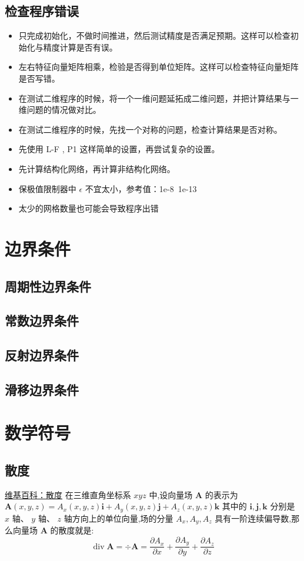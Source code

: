 \documentclass{book}
\begin{document}
\subsection{检查程序错误}
\begin{itemize}
  \item 只完成初始化，不做时间推进，然后测试精度是否满足预期。这样可以检查初始化与精度计算是否有误。
  \item 左右特征向量矩阵相乘，检验是否得到单位矩阵。这样可以检查特征向量矩阵是否写错。
  \item 在测试二维程序的时候，将一个一维问题延拓成二维问题，并把计算结果与一维问题的情况做对比。
  \item 在测试二维程序的时候，先找一个对称的问题，检查计算结果是否对称。
  \item 先使用 L-F , P1 这样简单的设置，再尝试复杂的设置。
  \item 先计算结构化网络，再计算非结构化网络。
  \item 保极值限制器中 $\epsilon$ 不宜太小，参考值：1e-8~1e-13
  \item 太少的网格数量也可能会导致程序出错
\end{itemize}

\section{边界条件}
\subsection{周期性边界条件}
\subsection{常数边界条件}
\subsection{反射边界条件}
\subsection{滑移边界条件}


\section{数学符号}
\subsection{散度}
\href{https://zh.wikipedia.org/zh-hans/%E6%95%A3%E5%BA%A6}{维基百科：散度} 
在三维直角坐标系  $x y z$  中,设向量场  $\boldsymbol{A}$  的表示为
$\boldsymbol{A}(x, y, z)=A_{x}(x, y, z) \boldsymbol{i}+A_{y}(x, y, z) \boldsymbol{j}+A_{z}(x, y, z) \boldsymbol{k}$ 其中的  $\boldsymbol{i}, \boldsymbol{j}, \boldsymbol{k} $ 分别是  $x$  轴、  $y$  轴、  $z$  轴方向上的单位向量,场的分量  $A_{x}, A_{y}, A_{z}$  具有一阶连续偏导数,那么向量场  $\boldsymbol{A}$  的散度就是:
\begin{equation}
  \operatorname{div} \boldsymbol{A}=\div \boldsymbol{A}=\dfrac{\partial A_{x}}{\partial x}+\dfrac{\partial A_{y}}{\partial y}+\dfrac{\partial A_{z}}{\partial z}
\end{equation}
\end{document}
